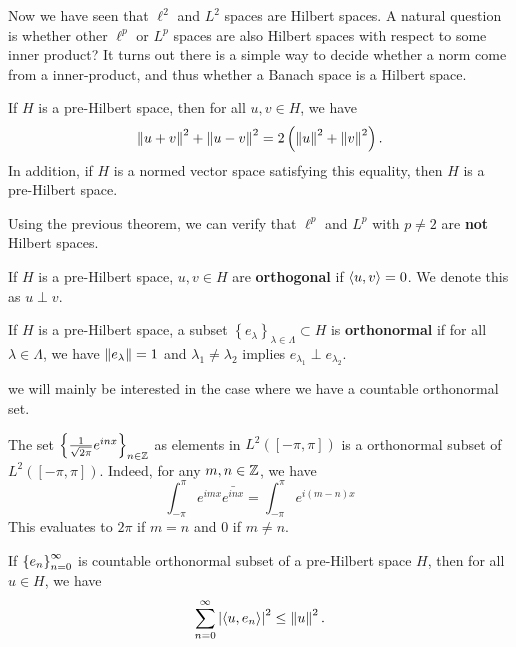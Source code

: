 \documentclass[a4paper]{article}
\begin{document}
Now we have seen that $\ell^2$ and $L^2$ spaces are 
Hilbert spaces. A natural question is whether
other $\ell^p$ or $L^p$ spaces are also Hilbert spaces
with respect to some inner product?
It turns out there is a simple way to decide whether a 
norm come from a inner-product, and thus whether a 
Banach space is a Hilbert space. 

\begin{thm}
If $H$ is a pre-Hilbert space, then for all $u, v \in H$, 
we have 
\[
  \left\lVert u + v\right\rVert^2 + \left\lVert u - v\right\rVert^2 = 2 \left( \left\lVert u\right\rVert^2 
  + \left\lVert v\right\rVert^2 \right).
\]
In addition, if $H$ is a normed vector space satisfying this 
equality, then $H$ is a pre-Hilbert space.
\end{thm}

Using the previous theorem, we can verify that 
$\ell^p$ and $L^p$ with $p \neq 2$ are \textbf{not} 
Hilbert spaces.

\begin{defi}[Orthogonal]
  If $H$ is a pre-Hilbert space, $u, v \in H$ are 
  \textbf{orthogonal} if $\left\langle u, v \right\rangle = 0$. 
  We denote this as $u \perp v$.
\end{defi}

\begin{defi}
  If $H$ is a pre-Hilbert space, a subset $\left\{ e_\lambda 
  \right\}_{\lambda \in \Lambda} \subset H$ is 
  \textbf{orthonormal} if for all $\lambda \in \Lambda$,
  we have $\left\lVert e_\lambda\right\rVert = 1$ and $\lambda_1 \neq \lambda_2$
  implies $e_{\lambda_1} \perp e_{\lambda_2}$.
\end{defi}

\begin{remark}
  we will mainly be interested in the case where we have a 
  countable orthonormal set.
\end{remark}

\begin{eg}
  The set $\left\{ \frac{1}{\sqrt{2\pi}} e^{i n x} \right\}_{n \in \mathbb{Z}}$
  as elements in $L^2([-\pi, \pi])$ 
  is a orthonormal subset of $L^2([-\pi, \pi])$. 
  Indeed, for any $m, n \in \mathbb{Z}$, we have 
  \[
  \int_{-\pi}^\pi e^{imx} \bar{e^{inx}} 
  = \int_{-\pi}^\pi e^{i(m - n)x}
  \]
  This evaluates to $2 \pi$ if $m = n$ and $0$ if 
  $m \neq n$.
\end{eg}

\begin{thm}[Bessel]
If $\left\{ e_n \right\}_{n=0}^\infty$ is countable orthonormal subset 
of a pre-Hilbert space $H$, then for all 
$u \in H$, we have 
\[
\sum_{n=0}^\infty \left\lvert \left\langle u, e_n \right\rangle\right\rvert^2 \leq \left\lVert u\right\rVert^2.
\]
\end{thm}
\end{document}
